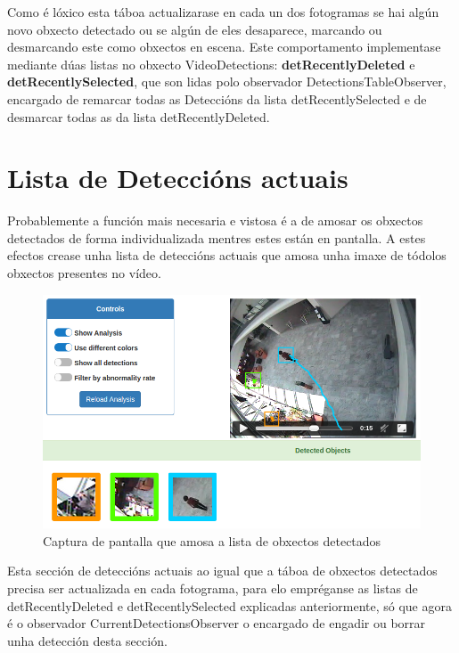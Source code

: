     Como é lóxico esta táboa actualizarase en cada un dos fotogramas se hai algún novo obxecto 
    detectado ou se algún de eles desaparece, marcando ou desmarcando este como obxectos en escena.
    Este comportamento implementase mediante dúas listas no obxecto VideoDetections: 
    \textbf{detRecentlyDeleted} e \textbf{detRecentlySelected}, que son lidas polo observador 
    DetectionsTableObserver, encargado de remarcar todas as Deteccións da lista detRecentlySelected
    e de desmarcar todas as da lista detRecentlyDeleted.
    
\section{Lista de Deteccións actuais}

    Probablemente a función mais necesaria e vistosa é a de amosar os obxectos detectados de forma 
    individualizada mentres estes están en pantalla. A estes efectos crease unha lista de deteccións
    actuais que amosa unha imaxe de tódolos obxectos presentes no vídeo.
    
    \begin{figure}[htp]
    \begin{center}
        \includegraphics[scale=0.4]{figures/detectedObjects.png}
        \caption{Captura de pantalla que amosa a lista de obxectos detectados}
    \label{fig:detectedObjects}
    \end{center}
    \end{figure}
   
    Esta sección de deteccións actuais ao igual que a táboa de obxectos detectados precisa ser 
    actualizada en cada fotograma, para elo empréganse as listas de detRecentlyDeleted e 
    detRecentlySelected explicadas anteriormente, só que agora é o observador 
    CurrentDetectionsObserver o encargado de engadir ou borrar unha detección desta sección.
    
